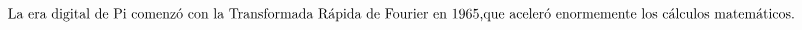 \documentclass[preview]{standalone}
\begin{document}
\begin{align*}
\text{La era digital de Pi comenzó con la Transformada Rápida de Fourier en 1965,} \newline \text{que aceleró enormemente los cálculos matemáticos.}
\end{align*}
\end{document}
